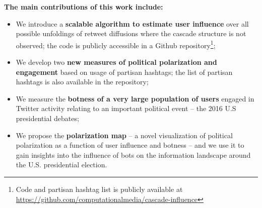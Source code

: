 
%
% 
%

\textbf{The main contributions of this work include:}
\begin{itemize}
	\item We introduce a \textbf{scalable algorithm to estimate user influence} over all possible unfoldings of retweet diffusions where the cascade structure is not observed;
	the code is publicly accessible in a Github repository\footnote{Code and partisan hashtag list is publicly available at \url{https://github.com/computationalmedia/cascade-influence}};

	\item We develop two \textbf{new measures of political polarization and engagement} based on usage of partisan hashtags;
	the list of partisan hashtags is also available in the repository;
	
	\item We measure the \textbf{botness of a very large population of users} engaged in Twitter activity relating to an important political event -- the 2016 U.S presidential debates;
		
	\item We propose the \textbf{polarization map} -- a novel visualization of political polarization as a function of user influence and botness -- and we use it to gain insights into the influence of bots on the information landscape around the U.S. presidential election.
\end{itemize}